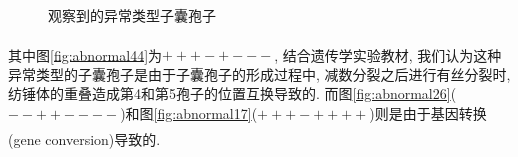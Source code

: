 \documentclass[]{LZUThesis}
\newcommand{\upcite}[1]{\textsuperscript{\textsuperscript{\cite{#1}}}}
\begin{document}
\begin{figure}[htbp]
    \centering

    \hfill
    \hfill
    \caption{观察到的异常类型子囊孢子}
    \label{fig:abnormal}
\end{figure}

其中图\ref{fig:abnormal44}为$+++-+---$, 结合遗传学实验教材\upcite{2018LZUgeneticexp}, 我们认为这种异常类型的子囊孢子是由于子囊孢子的形成过程中, 减数分裂之后进行有丝分裂时, 纺锤体的重叠造成第4和第5孢子的位置互换导致的.
而图\ref{fig:abnormal26}($--++----$)和图\ref{fig:abnormal17}($+++-++++$)则是由于基因转换(gene conversion)\upcite{geneconver1, geneconver2, geneconver3}导致的.
\end{document}

